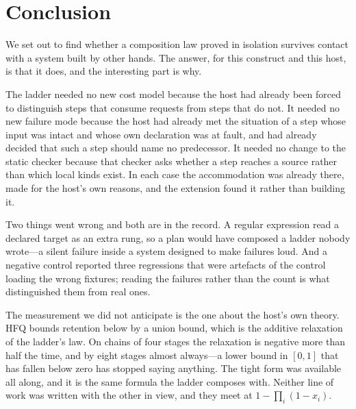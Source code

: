 \documentclass[11pt,twocolumn,a4paper]{article}
\theoremstyle{plain}
\theoremstyle{definition}
\theoremstyle{remark}
\begin{document}
\section{Conclusion}
\label{sec:conclusion}

We set out to find whether a composition law proved in isolation survives
contact with a system built by other hands. The answer, for this construct and
this host, is that it does, and the interesting part is why.

The ladder needed no new cost model because the host had already been forced to
distinguish steps that consume requests from steps that do not. It needed no
new failure mode because the host had already met the situation of a step whose
input was intact and whose own declaration was at fault, and had already
decided that such a step should name no predecessor. It needed no change to the
static checker because that checker asks whether a step reaches a source rather
than which local kinds exist. In each case the accommodation was already there,
made for the host's own reasons, and the extension found it rather than
building it.

Two things went wrong and both are in the record. A regular expression read a
declared target as an extra rung, so a plan would have composed a ladder nobody
wrote---a silent failure inside a system designed to make failures loud. And a
negative control reported three regressions that were artefacts of the control
loading the wrong fixtures; reading the failures rather than the count is what
distinguished them from real ones.

The measurement we did not anticipate is the one about the host's own theory.
HFQ bounds retention below by a union bound, which is the additive relaxation
of the ladder's law. On chains of four stages the relaxation is negative more
than half the time, and by eight stages almost always---a lower bound in
$[0,1]$ that has fallen below zero has stopped saying anything. The tight form
was available all along, and it is the same formula the ladder composes with.
Neither line of work was written with the other in view, and they meet at
$1-\prod_i(1-x_i)$.



\end{document}
